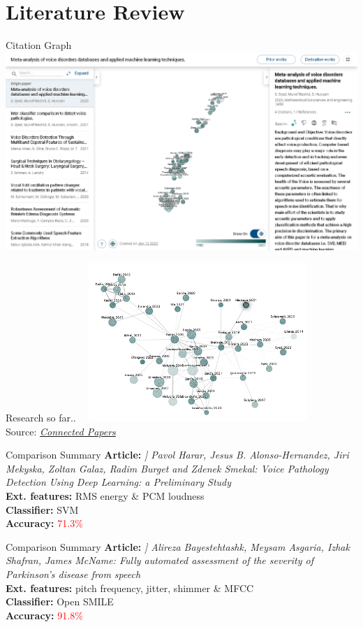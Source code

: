\documentclass{beamer}
\begin{document}
\section{Literature Review}
\begin{frame}{Citation Graph}
    \includegraphics[width=\textwidth]{pic1}
\end{frame}
\begin{frame}{Research so far..}
\centering
    \includegraphics[width=9cm, height=6cm]{cite2.PNG}
    \\\tiny Source: \textit{\href{https://www.connectedpapers.com/}{Connected Papers}}
\end{frame}
\begin{frame}{Comparison Summary}
\small \textbf{Article:} \textit{] Pavol Harar, Jesus B. Alonso-Hernandez, Jiri Mekyska, Zoltan Galaz, Radim Burget and Zdenek Smekal: Voice Pathology Detection Using Deep Learning: a Preliminary Study}
\\\small\textbf{Ext. features:} RMS energy \& PCM loudness
\\\small\textbf{Classifier:} SVM
\\\small\textbf{Accuracy:} \textcolor{red}{71.3\%}
\end{frame}
\begin{frame}{Comparison Summary}
\small \textbf{Article:} \textit{] Alireza Bayestehtashk, Meysam Asgaria, Izhak Shafran, James McName: Fully automated assessment of the severity of Parkinson’s disease from speech}
\\\small\textbf{Ext. features:} pitch frequency, jitter, shimmer \& MFCC
\\\small\textbf{Classifier:} Open SMILE
\\\small\textbf{Accuracy:} \textcolor{red}{91.8\%}
\end{frame}
\end{document}
